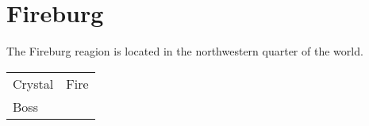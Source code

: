 \section{Fireburg}


The Fireburg reagion is located in the northwestern quarter of the world.

\noindent\begin{tabularx}{\textwidth}[l]{lX}
	Crystal & Fire \\
	Boss & \nameref{monster:dualhead_hydra}
\end{tabularx}














